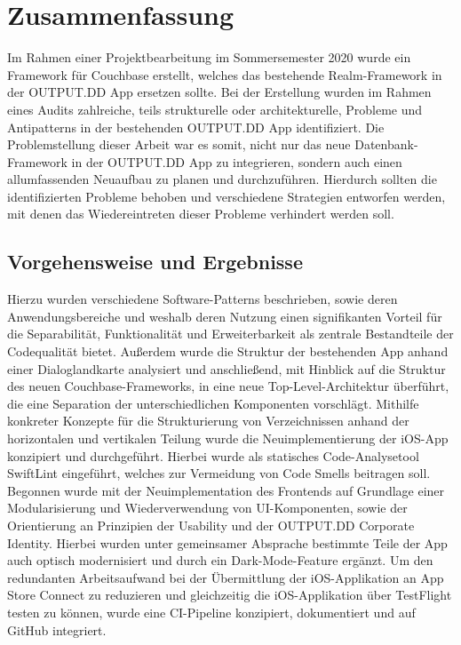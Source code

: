 \chapter{Zusammenfassung}\label{ch:zusammenfassung}

Im Rahmen einer Projektbearbeitung im Sommersemester 2020 wurde ein Framework für Couchbase erstellt, welches das bestehende Realm-Framework in der OUTPUT.DD App ersetzen sollte. Bei der Erstellung wurden im Rahmen eines Audits zahlreiche, teils strukturelle oder architekturelle, Probleme und Antipatterns in der bestehenden OUTPUT.DD App identifiziert. Die Problemstellung dieser Arbeit war es somit, nicht nur das neue Datenbank-Framework in der OUTPUT.DD App zu integrieren, sondern auch einen allumfassenden Neuaufbau zu planen und durchzuführen. Hierdurch sollten die identifizierten Probleme behoben und verschiedene Strategien entworfen werden, mit denen das Wiedereintreten dieser Probleme verhindert werden soll.

\section{Vorgehensweise und Ergebnisse}

\noindent Hierzu wurden verschiedene Software-Patterns beschrieben, sowie deren Anwendungsbereiche und weshalb deren Nutzung einen signifikanten Vorteil für die Separabilität, Funktionalität und Erweiterbarkeit als zentrale Bestandteile der Codequalität bietet. Außerdem wurde die Struktur der bestehenden App anhand einer Dialoglandkarte analysiert und anschließend, mit Hinblick auf die Struktur des neuen Couchbase-Frameworks, in eine neue Top-Level-Architektur überführt, die eine Separation der unterschiedlichen Komponenten vorschlägt. Mithilfe konkreter Konzepte für die Strukturierung von Verzeichnissen anhand der horizontalen und vertikalen Teilung wurde die Neuimplementierung der iOS-App konzipiert und durchgeführt. Hierbei wurde als statisches Code-Analysetool SwiftLint eingeführt, welches zur Vermeidung von Code Smells beitragen soll. Begonnen wurde mit der Neuimplementation des Frontends auf Grundlage einer Modularisierung und Wiederverwendung von UI-Komponenten, sowie der Orientierung an Prinzipien der Usability und der OUTPUT.DD Corporate Identity. Hierbei wurden unter gemeinsamer Absprache bestimmte Teile der App auch optisch modernisiert und durch ein Dark-Mode-Feature ergänzt. Um den redundanten Arbeitsaufwand bei der Übermittlung der iOS-Applikation an App Store Connect zu reduzieren und gleichzeitig die iOS-Applikation über TestFlight testen zu können, wurde eine CI-Pipeline konzipiert, dokumentiert und auf GitHub integriert.

